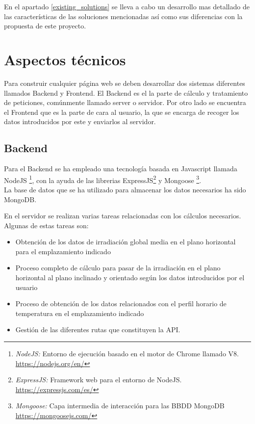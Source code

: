 En el apartado \ref{existing_solutions}  se lleva a cabo un desarrollo mas detallado de las características de las soluciones mencionadas así como sus diferencias con la propuesta de este proyecto.

\section{Aspectos técnicos}

Para construir cualquier página web se deben desarrollar dos sistemas diferentes llamados Backend y Frontend.
El Backend es el la parte de cálculo y tratamiento de peticiones, comúnmente llamado server o servidor. Por otro lado se encuentra el Frontend que es la parte de cara al usuario, la que se encarga de recoger los datos introducidos por este y enviarlos al servidor.

\subsection{Backend}

Para el Backend se ha empleado una tecnología basada en Javascript llamada NodeJS \footnote{\textit{NodeJS:} Entorno de ejecución basado en el motor de Chrome llamado V8. \url{https://nodejs.org/en/} }, con la ayuda de las librerias ExpressJS\footnote{\textit{ExpressJS:} Framework web para el entorno de NodeJS. \url{https://expressjs.com/es/}} y Mongoose \footnote{\textit{Mongoose:} Capa intermedia de interacción para las BBDD MongoDB \url{https://mongoosejs.com/}}.   \\
La base de datos que se ha utilizado para almacenar los datos necesarios ha sido MongoDB.

En el servidor se realizan varias tareas relacionadas con los cálculos necesarios. Algunas de estas tareas son:
\begin{itemize}
\item Obtención de los datos de irradiación global media en el plano horizontal para el emplazamiento indicado
\item Proceso completo de cálculo para pasar de la irradiación en el plano horizontal al plano inclinado y orientado según los datos introducidos por el usuario
\item Proceso de obtención de los datos relacionados con el perfil horario de temperatura en el emplazamiento indicado
\item Gestión de las diferentes rutas que constituyen la API.
\end{itemize}

